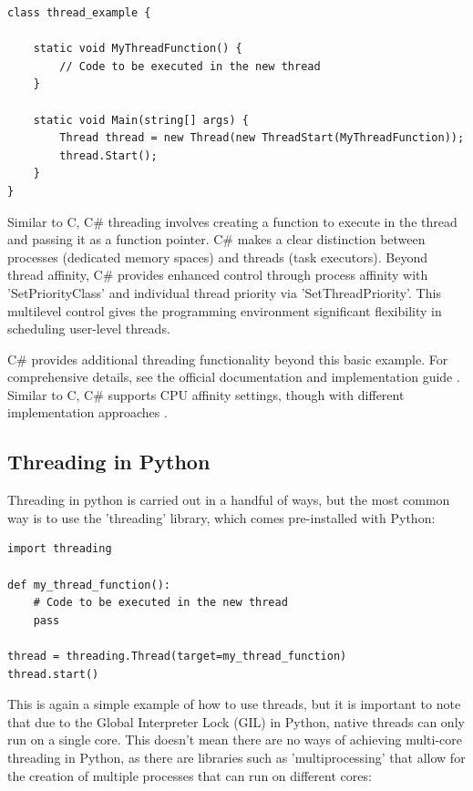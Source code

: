 \documentclass[12pt,a4paper]{article}
\begin{document}
\begin{verbatim}
class thread_example {

    static void MyThreadFunction() {
        // Code to be executed in the new thread
    }

    static void Main(string[] args) {
        Thread thread = new Thread(new ThreadStart(MyThreadFunction));
        thread.Start();
    }
}
\end{verbatim}

Similar to C, C\# threading involves creating a function to execute in the thread and passing it as a function pointer. C\# makes a clear distinction between processes (dedicated memory spaces) and threads (task executors)\parencite{White2020}. Beyond thread affinity, C\# provides enhanced control through process affinity with 'SetPriorityClass' and individual thread priority via 'SetThreadPriority'\parencite{CSThreadPriority}. This multilevel control gives the programming environment significant flexibility in scheduling user-level threads.

C\# provides additional threading functionality beyond this basic example. For comprehensive details, see the official documentation  and implementation guide . Similar to C, C\# supports CPU affinity settings, though with different implementation approaches \parencite{CSProcessorAffinity}.

\subsection{Threading in Python}

Threading in python is carried out in a handful of ways, but the most common way is to use the 'threading' library\parencite{PythonThreading}, which comes pre-installed with Python:

\begin{verbatim}
import threading

def my_thread_function():
    # Code to be executed in the new thread
    pass

thread = threading.Thread(target=my_thread_function)
thread.start()
\end{verbatim}

This is again a simple example of how to use threads, but it is important to note that due to the Global Interpreter Lock (GIL) in Python, native threads can only run on a single core\parencite{PythonGIL}. This doesn't mean there are no ways of achieving multi-core threading in Python, as there are libraries such as 'multiprocessing' that allow for the creation of multiple processes that can run on different cores:
\end{document}
